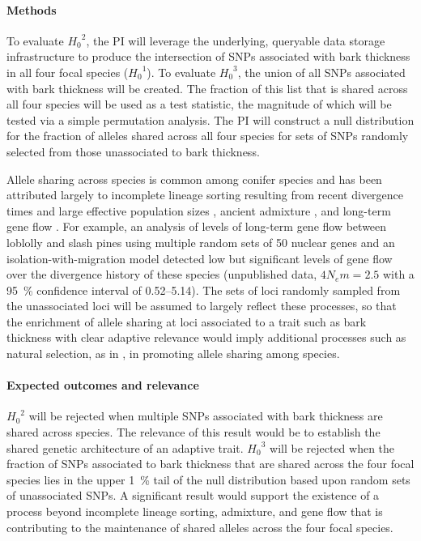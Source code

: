 \paragraph{Methods} To evaluate ${H_0}^2$, the PI will leverage the underlying, queryable data storage infrastructure 
to produce the intersection of SNPs associated with bark thickness in all four focal species (${H_0}^1$). To 
evaluate ${H_{0}}^3$, the union of all SNPs associated with bark thickness will be created. The fraction of this list 
that is shared across all four species will be used as a test statistic, the magnitude of which will be tested via a simple 
permutation analysis. The PI will construct a null distribution for the fraction of alleles shared across all four species 
for sets of SNPs randomly selected from those unassociated to bark thickness. 

Allele sharing across species is common among conifer species and has been attributed largely to incomplete lineage 
sorting resulting from recent divergence times and large effective population sizes \citep{Syring:2007gd,Willyard:2009ez}, 
ancient admixture \citep{Liston:2007cx}, and long-term gene flow \citep{Zhou:2010hk}. For example, an analysis of 
levels of long-term gene flow between loblolly and slash pines using multiple random sets of 50 nuclear genes and an 
isolation-with-migration model \citep{Becquet:2007js} detected low but significant levels of gene flow over the divergence history 
of these species (unpublished data, $4 N_{e}m = 2.5$ with a \SI{95}{\percent} confidence interval of 0.52--5.14). The sets of loci 
randomly sampled from the unassociated loci will be assumed to largely reflect these processes, so that the 
enrichment of allele sharing at loci associated to a trait such as bark thickness with clear adaptive relevance 
\citep{He:2012bz} would imply additional processes such as natural selection, as in \cite{Segurel:vf}, in promoting allele 
sharing among species.

\paragraph{Expected outcomes and relevance} ${H_0}^2$ will be rejected when multiple SNPs associated 
with bark thickness are shared across species. The relevance of this result would be to establish the shared genetic 
architecture of an adaptive trait. ${H_0}^3$ will be rejected when the fraction of SNPs associated to bark thickness that are 
shared across the four focal species lies in the upper \SI{1}{\percent} tail of the null distribution based upon random sets of 
unassociated SNPs. A significant result would support the existence of a process beyond incomplete lineage sorting, 
admixture, and gene flow that is contributing to the maintenance of shared alleles across the four focal species. 

